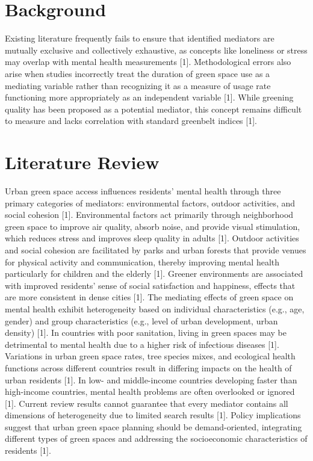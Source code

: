 \documentclass[conference]{IEEEtran}
\begin{document}
\section{Background}
Existing literature frequently fails to ensure that identified mediators are mutually exclusive and collectively exhaustive, as concepts like loneliness or stress may overlap with mental health measurements [1]. Methodological errors also arise when studies incorrectly treat the duration of green space use as a mediating variable rather than recognizing it as a measure of usage rate functioning more appropriately as an independent variable [1]. While greening quality has been proposed as a potential mediator, this concept remains difficult to measure and lacks correlation with standard greenbelt indices [1].

\section{Literature Review}
Urban green space access influences residents' mental health through three primary categories of mediators: environmental factors, outdoor activities, and social cohesion [1]. Environmental factors act primarily through neighborhood green space to improve air quality, absorb noise, and provide visual stimulation, which reduces stress and improves sleep quality in adults [1]. Outdoor activities and social cohesion are facilitated by parks and urban forests that provide venues for physical activity and communication, thereby improving mental health particularly for children and the elderly [1]. Greener environments are associated with improved residents' sense of social satisfaction and happiness, effects that are more consistent in dense cities [1]. The mediating effects of green space on mental health exhibit heterogeneity based on individual characteristics (e.g., age, gender) and group characteristics (e.g., level of urban development, urban density) [1]. In countries with poor sanitation, living in green spaces may be detrimental to mental health due to a higher risk of infectious diseases [1]. Variations in urban green space rates, tree species mixes, and ecological health functions across different countries result in differing impacts on the health of urban residents [1]. In low- and middle-income countries developing faster than high-income countries, mental health problems are often overlooked or ignored [1]. Current review results cannot guarantee that every mediator contains all dimensions of heterogeneity due to limited search results [1]. Policy implications suggest that urban green space planning should be demand-oriented, integrating different types of green spaces and addressing the socioeconomic characteristics of residents [1].
\end{document}
